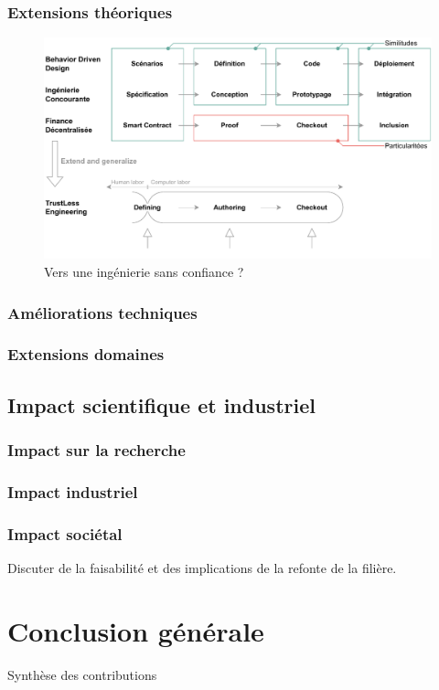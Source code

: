 \documentclass[a4paper,12pt]{article}
\begin{document}
\subsubsection{Extensions théoriques}
\label{sec:org7a9bd6a}

\begin{figure}[htbp]
\centering
\includegraphics[width=.9\linewidth]{./svg/long-term-goal.pdf}
\caption{\label{fig:org20b66c3}Vers une ingénierie sans confiance ?}
\end{figure}
\subsubsection{Améliorations techniques}
\label{sec:org1e31b24}
\subsubsection{Extensions domaines}
\label{sec:org62a05f4}
\subsection{Impact scientifique et industriel}
\label{sec:org7be5b2a}
\subsubsection{Impact sur la recherche}
\label{sec:org720490e}
\subsubsection{Impact industriel}
\label{sec:org16c6c14}
\subsubsection{Impact sociétal}
\label{sec:org3f06f61}
Discuter de la faisabilité et des implications de la refonte de la filière.
\clearpage
\section{Conclusion générale}
\label{sec:org83e2493}
Synthèse des contributions
\end{document}
